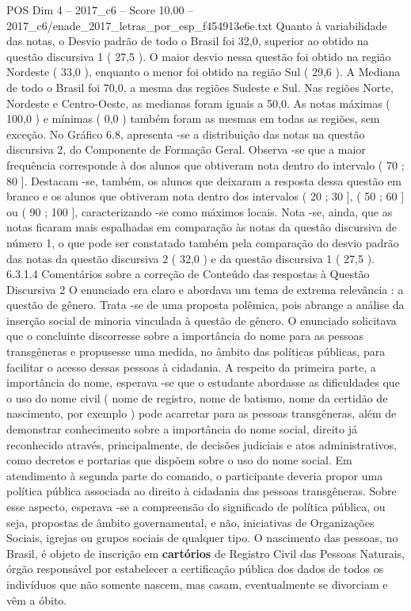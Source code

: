 \begin{textsample}{POS Dim 4 – 2017\_c6 – Score 10.00 – 2017\_c6/enade\_2017\_letras\_por\_esp\_f454913e6e.txt}
Quanto à variabilidade das notas, o Desvio padrão de todo o Brasil foi 32,0, superior ao obtido na questão discursiva 1 ( 27,5 ).
O maior desvio nessa questão foi obtido na região Nordeste ( 33,0 ), enquanto o menor foi obtido na região Sul ( 29,6 ).
A Mediana de todo o Brasil foi 70,0, a mesma das regiões Sudeste e Sul.
Nas regiões Norte, Nordeste e Centro-Oeste, as medianas foram iguais a 50,0.
As notas máximas ( 100,0 ) e mínimas ( 0,0 ) também foram as mesmas em todas as regiões, sem exceção.
No Gráfico 6.8, apresenta -se a distribuição das notas na questão discursiva 2, do Componente de Formação Geral.
Observa -se que a maior frequência corresponde à dos alunos que obtiveram nota dentro do intervalo ( 70 ; 80 ].
Destacam -se, também, os alunos que deixaram a resposta dessa questão em branco e os alunos que obtiveram nota dentro dos intervalos ( 20 ; 30 ], ( 50 ; 60 ] ou ( 90 ; 100 ], caracterizando -se como máximos locais.
Nota -se, ainda, que as notas ficaram mais espalhadas em comparação às notas da questão discursiva de número 1, o que pode ser constatado também pela comparação do desvio padrão das notas da questão discursiva 2 ( 32,0 ) e da questão discursiva 1 ( 27,5 ). 6.3.1.4 Comentários sobre a correção de Conteúdo das respostas à Questão Discursiva 2 O enunciado era claro e abordava um tema de extrema relevância : a questão de gênero.
Trata -se de uma proposta polêmica, pois abrange a análise da inserção social de minoria vinculada à questão de gênero.
O enunciado solicitava que o concluinte discorresse sobre a importância do nome para as pessoas transgêneras e propusesse uma medida, no âmbito das políticas públicas, para facilitar o acesso dessas pessoas à cidadania.
A respeito da primeira parte, a importância do nome, esperava -se que o estudante abordasse as dificuldades que o uso do nome civil ( nome de registro, nome de batismo, nome da certidão de nascimento, por exemplo ) pode acarretar para as pessoas transgêneras, além de demonstrar conhecimento sobre a importância do nome social, direito já reconhecido através, principalmente, de decisões judiciais e atos administrativos, como decretos e portarias que dispõem sobre o uso do nome social.
Em atendimento à segunda parte do comando, o participante deveria propor uma política pública associada ao direito à cidadania das pessoas transgêneras.
Sobre esse aspecto, esperava -se a compreensão do significado de política pública, ou seja, propostas de âmbito governamental, e não, iniciativas de Organizações Sociais, igrejas ou grupos sociais de qualquer tipo.
O nascimento das pessoas, no Brasil, é objeto de inscrição em \textbf{cartórios} de Registro Civil das Pessoas Naturais, órgão responsável por estabelecer a certificação pública dos dados de todos os indivíduos que não somente nascem, mas casam, eventualmente se divorciam e vêm a óbito.

\end{textsample}
